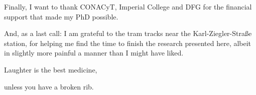 \vspace{\ackskip}
\noindent
Finally, I want to thank CONACyT, Imperial College and DFG for the financial support that made my PhD possible.


\vspace{\ackskip}
\noindent
And, as a last call: I am grateful to the tram tracks near the Karl-Ziegler-Straße station, for helping me find the time to finish the research presented here, albeit in slightly more painful a manner than I might have liked.




\vspace{1.25cm}

\hfill Laughter is the best medicine,

\hfill unless you have a broken rib.



















%










%
%









